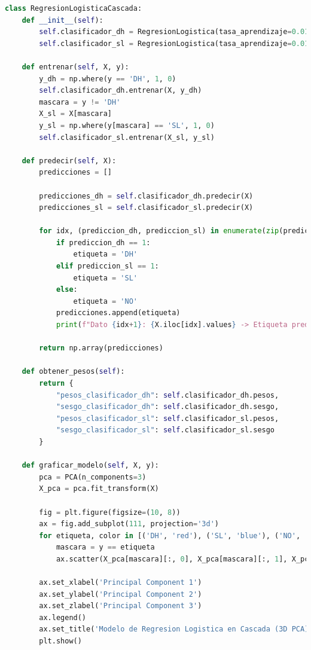 \documentclass[12pt]{article}
\begin{document}
\begin{lstlisting}[language=Python]
class RegresionLogisticaCascada:
    def __init__(self):
        self.clasificador_dh = RegresionLogistica(tasa_aprendizaje=0.01, num_iteraciones=1000)
        self.clasificador_sl = RegresionLogistica(tasa_aprendizaje=0.01, num_iteraciones=1000)

    def entrenar(self, X, y):
        y_dh = np.where(y == 'DH', 1, 0)
        self.clasificador_dh.entrenar(X, y_dh)
        mascara = y != 'DH'
        X_sl = X[mascara]
        y_sl = np.where(y[mascara] == 'SL', 1, 0)
        self.clasificador_sl.entrenar(X_sl, y_sl)

    def predecir(self, X):
        predicciones = []

        predicciones_dh = self.clasificador_dh.predecir(X)
        predicciones_sl = self.clasificador_sl.predecir(X)

        for idx, (prediccion_dh, prediccion_sl) in enumerate(zip(predicciones_dh, predicciones_sl)):
            if prediccion_dh == 1:
                etiqueta = 'DH'
            elif prediccion_sl == 1:
                etiqueta = 'SL'
            else:
                etiqueta = 'NO'
            predicciones.append(etiqueta)
            print(f"Dato {idx+1}: {X.iloc[idx].values} -> Etiqueta predicha: {etiqueta}")

        return np.array(predicciones)

    def obtener_pesos(self):
        return {
            "pesos_clasificador_dh": self.clasificador_dh.pesos,
            "sesgo_clasificador_dh": self.clasificador_dh.sesgo,
            "pesos_clasificador_sl": self.clasificador_sl.pesos,
            "sesgo_clasificador_sl": self.clasificador_sl.sesgo
        }
        
    def graficar_modelo(self, X, y):
        pca = PCA(n_components=3)
        X_pca = pca.fit_transform(X)

        fig = plt.figure(figsize=(10, 8))
        ax = fig.add_subplot(111, projection='3d')
        for etiqueta, color in [('DH', 'red'), ('SL', 'blue'), ('NO', 'green')]:
            mascara = y == etiqueta
            ax.scatter(X_pca[mascara][:, 0], X_pca[mascara][:, 1], X_pca[mascara][:, 2], c=color, label=etiqueta, depthshade=True)

        ax.set_xlabel('Principal Component 1')
        ax.set_ylabel('Principal Component 2')
        ax.set_zlabel('Principal Component 3')
        ax.legend()
        ax.set_title('Modelo de Regresion Logistica en Cascada (3D PCA)')
        plt.show()
\end{lstlisting}
\vspace{1cm}
\end{document}
